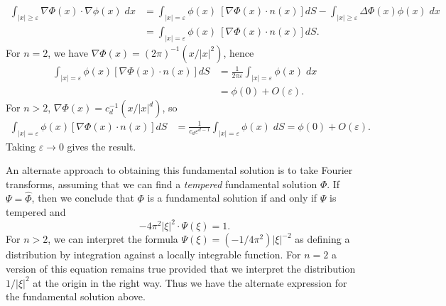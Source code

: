 \begin{example}
    \begin{align*}
        \int_{|x| \geq \varepsilon} \nabla \Phi(x) \cdot \nabla \phi(x)\; dx &= \int_{|x| = \varepsilon} \phi(x)\ [\nabla \Phi(x) \cdot n(x)] dS - \int_{|x| \geq \varepsilon} \Delta \Phi(x) \phi(x)\; dx\\
        &= \int_{|x| = \varepsilon} \phi(x)\ [\nabla \Phi(x) \cdot n(x)] dS.
    \end{align*}
    For $n = 2$, we have $\nabla \Phi(x) = (2 \pi)^{-1} (x/|x|^2)$, hence
    \begin{align*}
        \int_{|x| = \varepsilon} \phi(x) [\nabla \Phi(x) \cdot n(x)] dS &= \frac{1}{2 \pi \varepsilon} \int_{|x| = \varepsilon} \phi(x)\; dx\\
        &= \phi(0) + O(\varepsilon).
    \end{align*}
    For $n > 2$, $\nabla \Phi(x) = c_d^{-1} (x / |x|^d)$, so
    \begin{align*}
        \int_{|x| = \varepsilon} \phi(x) [\nabla \Phi(x) \cdot n(x)] dS &= \frac{1}{c_d \varepsilon^{d-1}} \int_{|x| = \varepsilon} \phi(x)\; dS = \phi(0) + O(\varepsilon).
    \end{align*}
    Taking $\varepsilon \to 0$ gives the result.

    An alternate approach to obtaining this fundamental solution is to take Fourier transforms, assuming that we can find a \emph{tempered} fundamental solution $\Phi$. If $\Psi = \widehat{\Phi}$, then we conclude that $\Phi$ is a fundamental solution if and only if $\Psi$ is tempered and
    \[ - 4\pi^2 |\xi|^2 \cdot \Psi(\xi) = 1. \]
    For $n > 2$, we can interpret the formula $\Psi(\xi) = (-1/4\pi^2) |\xi|^{-2}$ as defining a distribution by integration against a locally integrable function. For $n = 2$ a version of this equation remains true provided that we interpret the distribution $1/|\xi|^2$ at the origin in the right way. Thus we have the alternate expression for the fundamental solution above.
\end{example}

